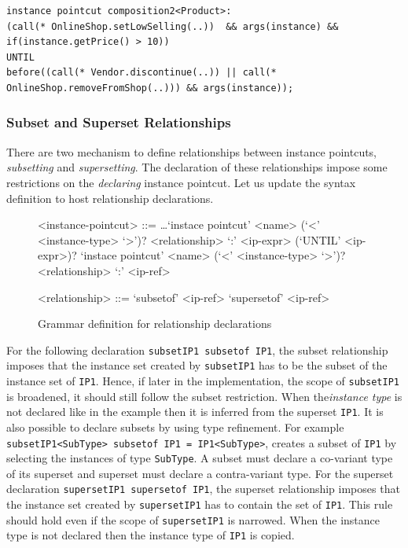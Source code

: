 \documentclass{llncs}
\begin{document}
\begin{lstlisting}[float=h!, caption={composition2 pointcut expression in full}, label={lst:comp2}]
instance pointcut composition2<Product>: 
(call(* OnlineShop.setLowSelling(..))  && args(instance) && if(instance.getPrice() > 10)) 
UNTIL
before((call(* Vendor.discontinue(..)) || call(* OnlineShop.removeFromShop(..))) && args(instance));
\end{lstlisting}



\subsubsection{Subset and Superset Relationships}
There are two mechanism to define relationships between instance pointcuts, \emph{subsetting} and \emph{supersetting}. The declaration of these relationships impose some restrictions on the \emph{declaring} instance pointcut. Let us update the syntax definition to host relationship declarations.

\begin{figure}[h]
\begin{grammar}
<instance-pointcut> ::= \ldots \alt `instace pointcut' <name> (`<' <instance-type> `>')? <relationship> `:' <ip-expr> (`UNTIL' <ip-expr>)?  \alt
	`instace pointcut' <name> (`<' <instance-type> `>')? <relationship> `:' <ip-ref>

<relationship> ::= `subsetof' <ip-ref> \alt `supersetof' <ip-ref>
\end{grammar}
\caption{Grammar definition for relationship declarations}
\label{fig:grammar3}
\end{figure}

For the following declaration \lstinline!subsetIP1 subsetof IP1!, the subset relationship imposes that the instance set created by \texttt{subsetIP1} has to be the subset of the instance set of \texttt{IP1}. Hence, if later in the implementation, the scope of \texttt{subsetIP1} is broadened, it should still follow the subset restriction. When the\emph{instance type} is not declared like in the example then it is inferred from the superset \texttt{IP1}. It is also possible to declare subsets by using type refinement. For example \lstinline!subsetIP1<SubType> subsetof IP1 = IP1<SubType>!, creates a subset of \texttt{IP1} by selecting the instances of type \texttt{SubType}. A subset must declare a co-variant type of its superset and superset must declare a contra-variant type.
For the superset declaration \lstinline!supersetIP1 supersetof IP1!, the superset relationship imposes that the instance set created by \texttt{supersetIP1} has to contain the set of \texttt{IP1}. This rule should hold even if the scope of \texttt{supersetIP1} is narrowed. When the instance type is not declared then the instance type of \texttt{IP1} is copied. 
\end{document}

